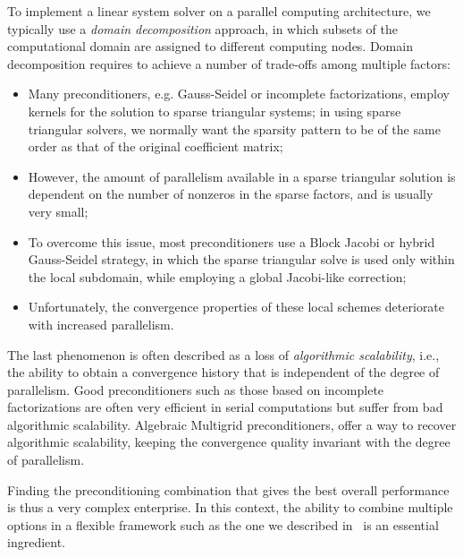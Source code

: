 To implement a linear system solver on a parallel computing
architecture, we typically use a \emph{domain decomposition} approach,
in which subsets of the computational domain are assigned to different
computing nodes. Domain decomposition requires to achieve a number of
trade-offs among multiple factors:
\begin{itemize}
\item Many preconditioners, e.g. Gauss-Seidel or incomplete
  factorizations, employ kernels for the solution to sparse triangular
  systems; in using sparse triangular solvers, we normally  want the
  sparsity pattern to be of the same order as that of the original
  coefficient matrix;
\item However, the amount of parallelism available in a sparse
  triangular solution is dependent on the number of nonzeros in the
  sparse factors, and is usually very small;
\item To overcome this issue, most preconditioners use a Block Jacobi
  or hybrid Gauss-Seidel strategy, in which the sparse triangular
  solve is used only within the local subdomain, while employing a
  global Jacobi-like correction;
\item Unfortunately, the convergence properties of these local schemes
  deteriorate with increased parallelism.
\end{itemize}
The last phenomenon is often described as a loss of \emph{algorithmic
  scalability}, i.e., the ability to obtain a convergence history that
is independent of the degree of parallelism. 
Good preconditioners such as those based on  incomplete factorizations
are often very efficient in serial  computations but suffer from
bad algorithmic scalability. 
Algebraic Multigrid  preconditioners, offer
a way to recover algorithmic scalability, keeping the convergence
quality invariant with the degree of parallelism. 

Finding the preconditioning combination that gives the best overall
performance is thus a very complex enterprise. In this context, the
ability to combine multiple options in a flexible framework such as
the one we described in~\cite{mld-toms} is an essential ingredient. 




